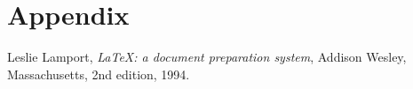 \documentclass[12pt,oneside,letterpaper]{report}
\begin{document}
\appendix

\chapter{Appendix}

% 
\lipsum




\cleardoublepage
{}


% 

\begin{thebibliography}{99}
  Leslie Lamport,
  \textit{\LaTeX: a document preparation system},
  Addison Wesley, Massachusetts,
  2nd edition,
  1994.
\end{thebibliography}
\end{document}
